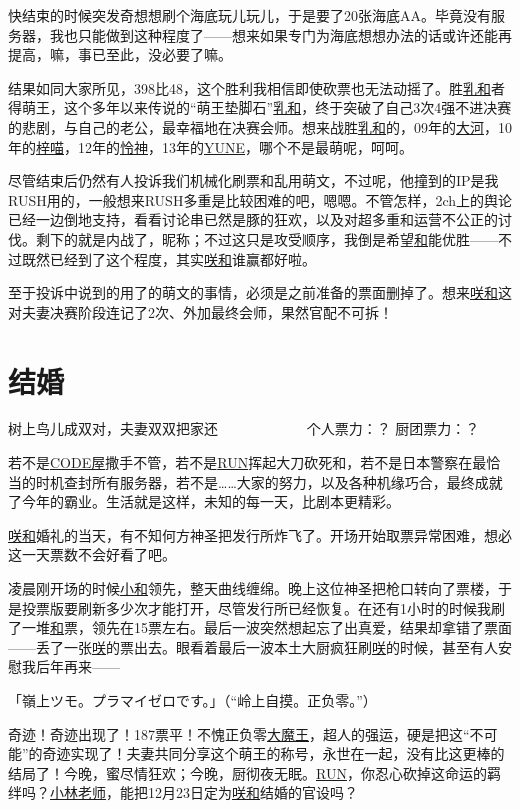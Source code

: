 快结束的时候突发奇想想刷个海底玩儿玩儿，于是要了20张海底AA。毕竟没有服务器，我也只能做到这种程度了——想来如果专门为海底想想办法的话或许还能再提高，嘛，事已至此，没必要了嘛。

结果如同大家所见，398比48，这个胜利我相信即使砍票也无法动摇了。胜\uline{乳和}者得萌王，这个多年以来传说的“萌王垫脚石”\uline{乳和}，终于突破了自己3次4强不进决赛的悲剧，与自己的老公，最幸福地在决赛会师。想来战胜\uline{乳和}的，09年的\uline{大河}，10年的\uline{梓喵}，12年的\uline{怜神}，13年的\uline{YUNE}，哪个不是最萌呢，呵呵。

尽管结束后仍然有人投诉我们机械化刷票和乱用萌文，不过呢，他撞到的IP是我RUSH用的，一般想来RUSH多重是比较困难的吧，嗯嗯。不管怎样，2ch上的舆论已经一边倒地支持，看看讨论串已然是豚的狂欢，以及对超多重和运营不公正的讨伐。剩下的就是内战了，昵称；不过这只是攻受顺序，我倒是希望\uline{和}能优胜——不过既然已经到了这个程度，其实\uline{咲}\uline{和}谁赢都好啦。

至于投诉中说到的用了的萌文的事情，必须是之前准备的票面删掉了。想来\uline{咲}\uline{和}这对夫妻决赛阶段连记了2次、外加最终会师，果然官配不可拆！

\chapter{结婚}
\begin{center}
{\subTitle 树上鸟儿成双对，夫妻双双把家还}
\subMemo
　　　　　　个人票力：？ 厨团票力：？
\end{center}

若不是\uline{CODE屋}撒手不管，若不是\uline{RUN}挥起大刀砍死和，若不是日本警察在最恰当的时机查封所有服务器，若不是……大家的努力，以及各种机缘巧合，最终成就了今年的霸业。生活就是这样，未知的每一天，比剧本更精彩。

\uline{咲}\uline{和}婚礼的当天，有不知何方神圣把发行所炸飞了。开场开始取票异常困难，想必这一天票数不会好看了吧。

凌晨刚开场的时候\uline{小和}领先，整天曲线缠绵。晚上这位神圣把枪口转向了票楼，于是投票版要刷新多少次才能打开，尽管发行所已经恢复。在还有1小时的时候我刷了一堆\uline{和}票，领先在15票左右。最后一波突然想起忘了出真爱，结果却拿错了票面——丢了一张\uline{咲}的票出去。眼看着最后一波本土大厨疯狂刷\uline{咲}的时候，甚至有人安慰我后年再来——

{\mincho 「嶺上ツモ。プラマイゼロです。」}（“岭上自摸。正负零。”）

奇迹！奇迹出现了！187票平！不愧正负零\uline{大魔王}，超人的强运，硬是把这“不可能”的奇迹实现了！夫妻共同分享这个萌王的称号，永世在一起，没有比这更棒的结局了！今晚，蜜尽情狂欢；今晚，厨彻夜无眠。\uline{RUN}，你忍心砍掉这命运的羁绊吗？\uline{小林老师}，能把12月23日定为\uline{咲}\uline{和}结婚的官设吗？

